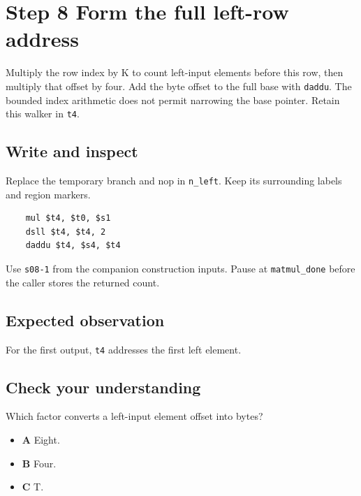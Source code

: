 \section{Step 8 Form the full left-row address}\label{matmul-s08}

Multiply the row index by K to count left-input elements before this row, then multiply that offset by four. Add the byte offset to the full base with \texttt{daddu}. The bounded index arithmetic does not permit narrowing the base pointer. Retain this walker in \texttt{t4}.

\subsection{Write and inspect}
Replace the temporary branch and nop in \texttt{n\_left}. Keep its surrounding labels and region markers.

\begin{verbatim}
    mul $t4, $t0, $s1
    dsll $t4, $t4, 2
    daddu $t4, $s4, $t4
\end{verbatim}
Use \texttt{s08-1} from the companion construction inputs. Pause at \texttt{matmul\_done} before the caller stores the returned count.

\subsection{Expected observation}
For the first output, \texttt{t4} addresses the first left element.

\subsection{Check your understanding}
Which factor converts a left-input element offset into bytes?

\begin{itemize}
  \item \textbf{A} Eight.
  \item \textbf{B} Four.
  \item \textbf{C} T.
\end{itemize}
